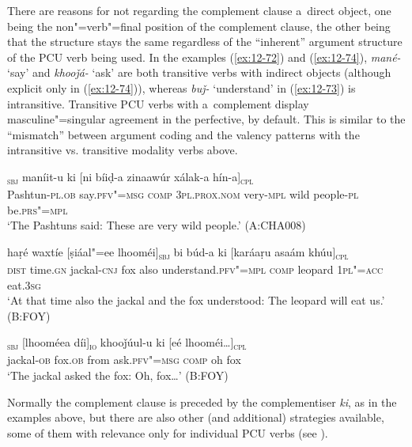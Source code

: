 There are reasons for not regarding the complement clause a~direct object, one being the non"=verb"=final position of the complement clause, the other being that the structure stays the same regardless of the ``inherent'' argument structure of the PCU verb being used. In the examples (\ref{ex:12-72}) and (\ref{ex:12-74}), \textit{mané-} `say' and \textit{khooǰá-} `ask' are both transitive verbs with indirect objects (although explicit only in (\ref{ex:12-74})), whereas \textit{buǰ-} `understand' in (\ref{ex:12-73}) is intransitive. Transitive PCU verbs with a~complement display masculine"=singular agreement in the perfective, by default. This is similar to the ``mismatch'' between argument coding and the valency patterns with the intransitive vs. transitive modality verbs above.

\begin{exe}
\ex
\label{ex:12-72}
\gll [ɡhueeṇíi-am]\textsubscript{\textsc{sbj}} maníit-u ki [ni bíiḍ-a zinaawúr xálak-a hín-a]\textsubscript{\textsc{cpl}} \\
Pashtun-\textsc{pl.ob} say.\textsc{pfv"=msg} \textsc{c}\textsc{om}\textsc{p} \textsc{3pl.prox.nom} very-\textsc{mpl}  wild people-\textsc{pl} be.\textsc{prs"=mpl} \\
\glt `The Pashtuns said: These are very wild people.' (A:CHA008)
\end{exe}
\begin{exe}
\ex
\label{ex:12-73}
\gll haṛé waxtíe [ṣiáal"=ee lhooméi]\textsubscript{\textsc{sbj}} bi búd-a ki \textsc{[}karáaṛu asaám khúu]\textsubscript{\textsc{cpl}} \\
\textsc{dist} time.\textsc{gn} jackal-\textsc{cnj} fox also  understand.\textsc{pfv"=mpl} \textsc{comp} leopard \textsc{1pl"=acc} eat.\textsc{3sg} \\
\glt `At that time also the jackal and the fox understood: The leopard will eat us.' (B:FOY)
\end{exe}
\begin{exe}
\ex
\label{ex:12-74}
\gll [ṣiúul-a]\textsubscript{\textsc{sbj}} [lhooméea díi]\textsubscript{\textsc{io}} khooǰúul-u ki [eé lhooméi{\ldots}]\textsubscript{\textsc{cpl}} \\
jackal-\textsc{ob} fox.\textsc{ob} from ask.\textsc{pfv"=msg} \textsc{comp} oh fox \\
\glt `The jackal asked the fox: Oh, fox{\ldots}' (B:FOY)
\end{exe}

Normally the complement clause is preceded by the complementiser \textit{ki}, as in the examples above, but there are also other (and additional) strategies available, some of them with relevance only for individual PCU verbs (see ). 


